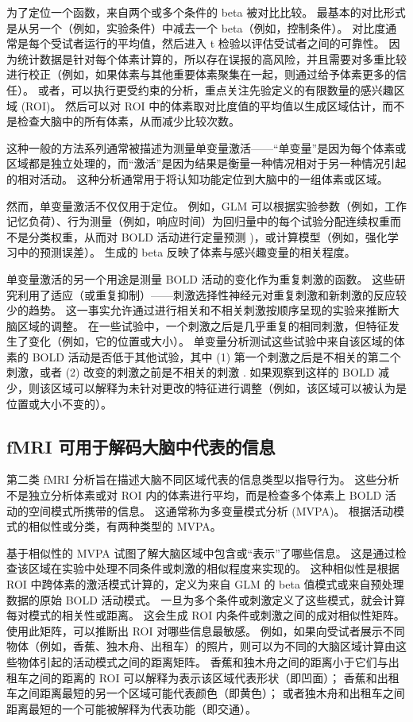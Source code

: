 为了定位一个函数，来自两个或多个条件的 beta 被对比比较。 最基本的对比形式是从另一个（例如，实验条件）中减去一个 beta（例如，控制条件）。 对比度通常是每个受试者运行的平均值，然后进入 t 检验以评估受试者之间的可靠性。 因为统计数据是针对每个体素计算的，所以存在误报的高风险，并且需要对多重比较进行校正（例如，如果体素与其他重要体素聚集在一起，则通过给予体素更多的信任）。 或者，可以执行更受约束的分析，重点关注先验定义的有限数量的感兴趣区域 (ROI)。 然后可以对 ROI 中的体素取对比度值的平均值以生成区域估计，而不是检查大脑中的所有体素，从而减少比较次数。

这种一般的方法系列通常被描述为测量单变量激活——“单变量”是因为每个体素或区域都是独立处理的，而“激活”是因为结果是衡量一种情况相对于另一种情况引起的相对活动。 这种分析通常用于将认知功能定位到大脑中的一组体素或区域。

然而，单变量激活不仅仅用于定位。 例如，GLM 可以根据实验参数（例如，工作记忆负荷）、行为测量（例如，响应时间）为回归量中的每个试验分配连续权重而不是分类权重，从而对 BOLD 活动进行定量预测 )，或计算模型（例如，强化学习中的预测误差）。 生成的 beta 反映了体素与感兴趣变量的相关程度。

单变量激活的另一个用途是测量 BOLD 活动的变化作为重复刺激的函数。 这些研究利用了适应（或重复抑制）——刺激选择性神经元对重复刺激和新刺激的反应较少的趋势。 这一事实允许通过进行相关和不相关刺激按顺序呈现的实验来推断大脑区域的调整。 在一些试验中，一个刺激之后是几乎重复的相同刺激，但特征发生了变化（例如，它的位置或大小）。 单变量分析测试这些试验中来自该区域的体素的 BOLD 活动是否低于其他试验，其中 (1) 第一个刺激之后是不相关的第二个刺激，或者 (2) 改变的刺激之前是不相关的刺激 . 如果观察到这样的 BOLD 减少，则该区域可以解释为未针对更改的特征进行调整（例如，该区域可以被认为是位置或大小不变的）。


\subsection{fMRI 可用于解码大脑中代表的信息}
第二类 fMRI 分析旨在描述大脑不同区域代表的信息类型以指导行为。 这些分析不是独立分析体素或对 ROI 内的体素进行平均，而是检查多个体素上 BOLD 活动的空间模式所携带的信息。 这通常称为多变量模式分析 (MVPA)。 根据活动模式的相似性或分类，有两种类型的 MVPA。

基于相似性的 MVPA 试图了解大脑区域中包含或“表示”了哪些信息。 这是通过检查该区域在实验中处理不同条件或刺激的相似程度来实现的。 这种相似性是根据 ROI 中跨体素的激活模式计算的，定义为来自 GLM 的 beta 值模式或来自预处理数据的原始 BOLD 活动模式。 一旦为多个条件或刺激定义了这些模式，就会计算每对模式的相关性或距离。 这会生成 ROI 内条件或刺激之间的成对相似性矩阵。 使用此矩阵，可以推断出 ROI 对哪些信息最敏感。 例如，如果向受试者展示不同物体（例如，香蕉、独木舟、出租车）的照片，则可以为不同的大脑区域计算由这些物体引起的活动模式之间的距离矩阵。 香蕉和独木舟之间的距离小于它们与出租车之间的距离的 ROI 可以解释为表示该区域代表形状（即凹面）； 香蕉和出租车之间距离最短的另一个区域可能代表颜色（即黄色）； 或者独木舟和出租车之间距离最短的一个可能被解释为代表功能（即交通）。

